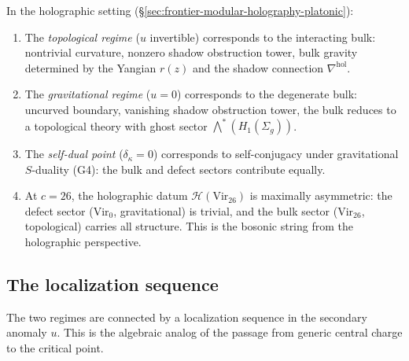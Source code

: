 \begin{remark}
\label{rem:g9-holographic}
In the holographic setting
(\S\ref{sec:frontier-modular-holography-platonic}):
\begin{enumerate}[label=\textup{(\alph*)}]
\item The \emph{topological regime} ($u$ invertible) corresponds to
the interacting bulk: nontrivial curvature, nonzero shadow obstruction tower,
bulk gravity determined by the Yangian $r(z)$ and the shadow
connection $\nabla^{\mathrm{hol}}$.

\item The \emph{gravitational regime} ($u = 0$) corresponds to the
degenerate bulk: uncurved boundary, vanishing shadow obstruction tower, the bulk
reduces to a topological theory with ghost sector
$\bigwedge^*(H_1(\Sigma_g))$.

\item The \emph{self-dual point} ($\delta_\kappa = 0$)
corresponds to self-conjugacy under gravitational $S$-duality (G4):
the bulk and defect sectors contribute equally.

\item At $c = 26$, the holographic datum
$\mathcal{H}(\mathrm{Vir}_{26})$ is maximally asymmetric: the defect
sector ($\mathrm{Vir}_0$, gravitational) is trivial, and the bulk
sector ($\mathrm{Vir}_{26}$, topological) carries all structure. This
is the bosonic string from the holographic perspective.
\end{enumerate}
\end{remark}

%
%

\subsection{The localization sequence}
\label{subsec:localization-sequence}

The two regimes are connected by a localization sequence in the
secondary anomaly $u$. This is the algebraic analog of the passage
from generic central charge to the critical point.

